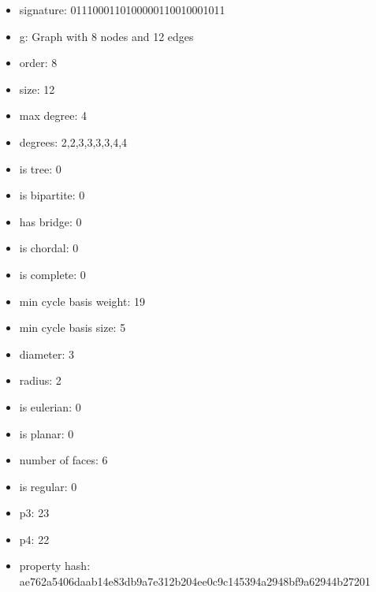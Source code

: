 \begin{itemize}
\item signature: 0111000110100000110010001011
\item g: Graph with 8 nodes and 12 edges
\item order: 8
\item size: 12
\item max degree: 4
\item degrees: 2,2,3,3,3,3,4,4
\item is tree: 0
\item is bipartite: 0
\item has bridge: 0
\item is chordal: 0
\item is complete: 0
\item min cycle basis weight: 19
\item min cycle basis size: 5
\item diameter: 3
\item radius: 2
\item is eulerian: 0
\item is planar: 0
\item number of faces: 6
\item is regular: 0
\item p3: 23
\item p4: 22
\item property hash: ae762a5406daab14e83db9a7e312b204ee0c9c145394a2948bf9a62944b27201
\end{itemize}
\newpage
\begin{figure}
\end{figure}
